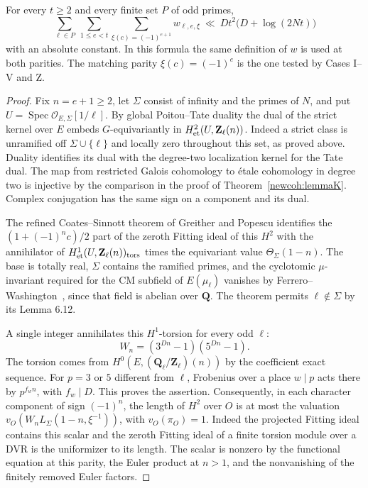 \begin{theorem}\label{zetafield:minus}
For every \(t\ge2\) and every finite set \(P\) of odd primes,
\[
 \sum_{\ell\in P}\ \sum_{1\le e<t}
 \sum_{\xi(c)=(-1)^{e+1}} w_{\ell,e,\xi}
 \ \ll\ D t^2\bigl(D+\log(2Nt)\bigr)
\]
with an absolute constant. In this formula the same definition of \(w\)
is used at both parities. The matching parity \(\xi(c)=(-1)^e\)
is the one tested by Cases I--V and Z.
\end{theorem}
\begin{proof}
Fix \(n=e+1\ge2\), let \(\Sigma\) consist of infinity and the primes
of \(N\), and put \(U=\operatorname{Spec}\mathcal O_{E,\Sigma}[1/\ell]\).
By global Poitou--Tate duality the dual of the strict kernel over \(E\)
embeds \(G\)-equivariantly in \(H^2_{\rm et}(U,\mathbf Z_\ell(n))\).
Indeed a strict class is unramified off \(\Sigma\cup\{\ell\}\) and
locally zero throughout this set, as proved above. Duality identifies
its dual with the degree-two localization kernel for the Tate dual.
The map from restricted Galois cohomology to \'{e}tale cohomology
in degree two is injective by the comparison in the proof of
Theorem~\ref{newcoh:lemmaK}. Complex conjugation has the same sign
on a component and its dual.

The refined Coates--Sinnott theorem of Greither and Popescu
\cite[Theorem 6.11]{greitherPopescuCS} identifies the
\((1+(-1)^nc)/2\) part of the zeroth Fitting ideal of this \(H^2\)
with the annihilator of \(H^1_{\rm et}(U,\mathbf Z_\ell(n))_{\rm tors}\)
times the equivariant value \(\Theta_\Sigma(1-n)\).
The base is totally real, \(\Sigma\) contains the ramified primes, and
the cyclotomic \(\mu\)-invariant required for the CM subfield of
\(E(\mu_\ell)\) vanishes by Ferrero--Washington~\cite{ferreroWashington},
since that field is abelian over \(\mathbf Q\).
The theorem permits \(\ell\notin\Sigma\) by its Lemma 6.12.

A single integer annihilates this \(H^1\)-torsion for every odd \(\ell\):
\[
 W_n=(3^{Dn}-1)(5^{Dn}-1).
\]
The torsion comes from \(H^0(E,(\mathbf Q_\ell/\mathbf Z_\ell)(n))\)
by the coefficient exact sequence. For \(p=3\) or \(5\) different
from \(\ell\), Frobenius over a place \(w\mid p\) acts there by
\(p^{f_wn}\), with \(f_w\mid D\). This proves the assertion. Consequently,
in each character component of sign \((-1)^n\), the length of \(H^2\)
over \(O\) is at most the valuation
\(v_O(W_n L_\Sigma(1-n,\xi^{-1}))\), with \(v_O(\pi_O)=1\).
Indeed the projected Fitting ideal contains this scalar and the
zeroth Fitting ideal of a finite torsion module over a DVR is the
uniformizer to its length. The scalar is nonzero by the functional
equation at this parity, the Euler product at \(n>1\), and the
nonvanishing of the finitely removed Euler factors.


\end{proof}
